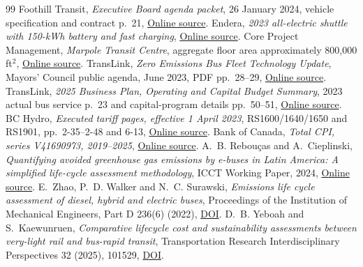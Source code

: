 \documentclass[12pt,letterpaper]{article}
\begin{document}
\begin{thebibliography}{99}
 Foothill Transit, \emph{Executive Board agenda packet}, 26 January 2024, vehicle specification and contract p.~21, \href{https://www.foothilltransit.org/sites/default/files/2024-01/01-26-24_eb_agenda_packet.pdf}{Online source}.
 Endera, \emph{2023 all-electric shuttle with 150-kWh battery and fast charging}, \href{https://www.enderamotors.com/press-releases/endera-unveils-the-2023-all-electric-shuttle-model-with-extended-range-and-fast-charging-speeds}{Online source}.
 Core Project Management, \emph{Marpole Transit Centre}, aggregate floor area approximately 800,000 ft$^2$, \href{https://corepm.ca/projects/marpole-transit-centre/}{Online source}.
 TransLink, \emph{Zero Emissions Bus Fleet Technology Update}, Mayors' Council public agenda, June 2023, PDF pp.~28--29, \href{https://www.translink.ca/-/media/translink/documents/about-translink/governance-and-board/council-minutes-and-reports/2023/june/agenda_mayors_council_public_mtg_june_2023.pdf}{Online source}.
 TransLink, \emph{2025 Business Plan, Operating and Capital Budget Summary}, 2023 actual bus service p.~23 and capital-program details pp.~50--51, \href{https://www.translink.ca/-/media/translink/documents/about-translink/corporate-reports/business_plan/2025-business-plan-operating-and-capital-budget-summary.pdf}{Online source}.
 BC Hydro, \emph{Executed tariff pages, effective 1 April 2023}, RS1600/1640/1650 and RS1901, pp.~2-35--2-48 and 6-13, \href{https://www.bchydro.com/content/dam/BCHydro/customer-portal/documents/corporate/suppliers/transmission-scheduling/bulletins/2023/2023_08_03_BCUC_EXEC_TRFF_PGS.pdf}{Online source}.
 Bank of Canada, \emph{Total CPI, series V41690973, 2019--2025}, \href{https://www.bankofcanada.ca/valet/observations/V41690973/json?start_date=2019-01-01&end_date=2025-12-31}{Online source}.
 A.~B. Rebou\c{c}as and A.~Cieplinski, \emph{Quantifying avoided greenhouse gas emissions by e-buses in Latin America: A simplified life-cycle assessment methodology}, ICCT Working Paper, 2024, \href{https://theicct.org/wp-content/uploads/2024/08/ID-118-\%E2\%80\%93-E-bus-radar_final2.pdf}{Online source}.
 E.~Zhao, P.~D. Walker and N.~C. Surawski, \emph{Emissions life cycle assessment of diesel, hybrid and electric buses}, Proceedings of the Institution of Mechanical Engineers, Part D 236(6) (2022), \href{https://doi.org/10.1177/09544070211034318}{DOI}.
 D.~B. Yeboah and S.~Kaewunruen, \emph{Comparative lifecycle cost and sustainability assessments between very-light rail and bus-rapid transit}, Transportation Research Interdisciplinary Perspectives 32 (2025), 101529, \href{https://doi.org/10.1016/j.trip.2025.101529}{DOI}.

\end{thebibliography}
\end{document}
